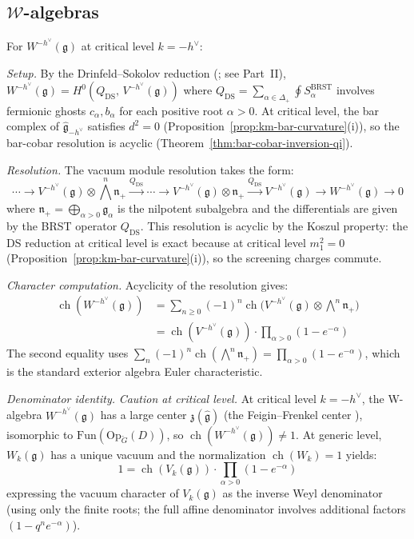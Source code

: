 \subsection{$\mathcal{W}$-algebras}

\begin{calculation}
For $W^{-h^\vee}(\mathfrak{g})$ at critical level $k = -h^\vee$:

\emph{Setup.}
By the Drinfeld--Sokolov reduction (\cite{FF}; see Part~II),
$W^{-h^\vee}(\mathfrak{g}) = H^0(Q_{\mathrm{DS}},\, V^{-h^\vee}(\mathfrak{g}))$
where $Q_{\mathrm{DS}} = \sum_{\alpha \in \Delta_+} \oint S_\alpha^{\mathrm{BRST}}$
involves fermionic ghosts $c_\alpha, b_\alpha$ for each positive root $\alpha > 0$.
At critical level, the bar complex of $\widehat{\mathfrak{g}}_{-h^\vee}$ satisfies
$d^2 = 0$ (Proposition~\ref{prop:km-bar-curvature}(i)), so the bar-cobar resolution
is acyclic (Theorem~\ref{thm:bar-cobar-inversion-qi}).

\emph{Resolution.}
The vacuum module resolution takes the form:
\[
\cdots \to V^{-h^\vee}(\mathfrak{g}) \otimes \textstyle\bigwedge^n \mathfrak{n}_+
\xrightarrow{Q_{\mathrm{DS}}}
\cdots \to V^{-h^\vee}(\mathfrak{g}) \otimes \mathfrak{n}_+
\xrightarrow{Q_{\mathrm{DS}}} V^{-h^\vee}(\mathfrak{g})
\to W^{-h^\vee}(\mathfrak{g}) \to 0
\]
where $\mathfrak{n}_+ = \bigoplus_{\alpha > 0} \mathfrak{g}_\alpha$ is the nilpotent
subalgebra and the differentials are given by the BRST operator $Q_{\mathrm{DS}}$.
This resolution is acyclic by the Koszul property: the DS reduction at critical level
is exact because at critical level $m_1^2 = 0$ (Proposition~\ref{prop:km-bar-curvature}(i)), so the screening charges commute.

\emph{Character computation.}
Acyclicity of the resolution gives:
\begin{align}
\operatorname{ch}(W^{-h^\vee}(\mathfrak{g}))
&= \sum_{n \geq 0} (-1)^n \operatorname{ch}\bigl(V^{-h^\vee}(\mathfrak{g})
\otimes \textstyle\bigwedge^n \mathfrak{n}_+\bigr) \\
&= \operatorname{ch}(V^{-h^\vee}(\mathfrak{g})) \cdot
\prod_{\alpha > 0} (1 - e^{-\alpha})
\end{align}
The second equality uses $\sum_n (-1)^n \operatorname{ch}(\bigwedge^n \mathfrak{n}_+)
= \prod_{\alpha > 0}(1 - e^{-\alpha})$, which is the standard exterior algebra
Euler characteristic.

\emph{Denominator identity.}
\emph{Caution at critical level.}
At critical level $k = -h^\vee$, the W-algebra $W^{-h^\vee}(\mathfrak{g})$ has a large center $\mathfrak{z}(\widehat{\mathfrak{g}})$ (the Feigin--Frenkel center \cite{Feigin-Frenkel}), isomorphic to $\mathrm{Fun}(\mathrm{Op}_{\check{G}}(D))$, so $\operatorname{ch}(W^{-h^\vee}(\mathfrak{g})) \neq 1$.  At generic level, $W_k(\mathfrak{g})$ has a unique vacuum and the normalization $\operatorname{ch}(W_k) = 1$ yields:
\[
1 = \operatorname{ch}(V_k(\mathfrak{g})) \cdot
\prod_{\alpha > 0}(1 - e^{-\alpha})
\]
expressing the vacuum character of $V_k(\mathfrak{g})$ as the inverse Weyl denominator (using only the finite roots; the full affine denominator involves additional factors $(1 - q^n e^{-\alpha})$).
\end{calculation}

